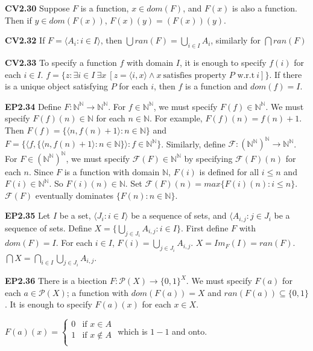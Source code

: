 \documentclass[10pt, landscape]{article}
\begin{document}
\begin{multicols*}{3}
\textbf{CV2.30} Suppose $F$ is a function, $x \in dom(F)$, and $F(x)$ is also a function. Then if $y \in dom(F(x))$, $F(x)(y)=(F(x))(y)$.

\textbf{CV2.32} If $F=\langle A_i:i \in I\rangle$, then $\bigcup ran(F)=\bigcup_{i\in I}A_i$, similarly for $\bigcap ran(F)$

\textbf{CV2.33} To specify a function $f$ with domain $I$, it is enough to specify $f(i)$ for each $i \in I$. $f=\{z:\exists i \in I \ \exists x \ [z=\langle i, x \rangle \land x\ \text{satisfies property $P$ w.r.t}\ i]\}$. If there is a unique object satisfying $P$ for each $i$, then $f$ is a function and $dom(f)=I$.

\textbf{EP2.34} Define $F: \mathbb{N}^\mathbb{N} \rightarrow \mathbb{N}^\mathbb{N}$. For $f \in \mathbb{N}^\mathbb{N}$, we must specify $F(f) \in \mathbb{N}^\mathbb{N}$. We must specify $F(f)(n)\in \mathbb{N}$ for each $n \in \mathbb{N}$. For example, $F(f)(n)=f(n)+1$. Then $F(f)=\{\langle n, f(n)+1 \rangle : n \in \mathbb{N}\}$ and $F=\{\langle f, \{\langle n, f(n)+1 \rangle : n \in \mathbb{N}\}\rangle  : f \in \mathbb{N}^\mathbb{N}\}$. Similarly, define $\mathcal{F} : (\mathbb{N}^\mathbb{N})^\mathbb{N} \rightarrow \mathbb{N}^\mathbb{N}$. For $F\in (\mathbb{N}^\mathbb{N})^\mathbb{N}$, we must specify $\mathcal{F}(F)\in \mathbb{N}^\mathbb{N}$ by specifying $\mathcal{F}(F)(n)$ for each $n$. Since $F$ is a function with domain $\mathbb{N}$, $F(i)$ is defined for all $i \leq n$ and $F(i)\in \mathbb{N}^\mathbb{N}$. So $F(i)(n) \in \mathbb{N}$. Set $\mathcal{F}(F)(n)=max\{F(i)(n) : i \leq n\}$. $\mathcal{F}(F)$ eventually dominates $\{F(n):n \in \mathbb{N}\}$.

\textbf{EP2.35} Let $I$ be a set, $\langle J_i : i \in I \rangle$ be a sequence of sets, and $\langle A_{i, j} : j \in J_i$ be a sequence of sets. Define $X=\{\bigcup_{j\in J_i}A_{i, j}: i \in I\}$. First define $F$ with $dom(F)=I$. For each $i \in I$, $F(i) = \bigcup_{j \in J_i}A_{i, j}$. $X=Im_F(I)=ran(F)$. $\bigcap X=\bigcap_{i \in I}\bigcup_{j \in J_i}A_{i, j}$.

\textbf{EP2.36} There is a biection $F:\mathcal{P}(X)\rightarrow \{0,1\}^X$. We must specify $F(a)$ for each $a \in \mathcal{P}(X)$; a function with $dom(F(a))=X$ and $ran(F(a)) \subseteq\{0, 1\}$. It is enough to specify $F(a)(x)$ for each $x \in X$.

$F(a)(x) =
    \left\{
    \begin{array}{lr}
      0 & \text{if $x \in A$} \\
      1 & \text{if $x \notin A$} \\
    \end{array}
    \right.
$ which is $1-1$ and onto.


\end{multicols*}
\end{document}
